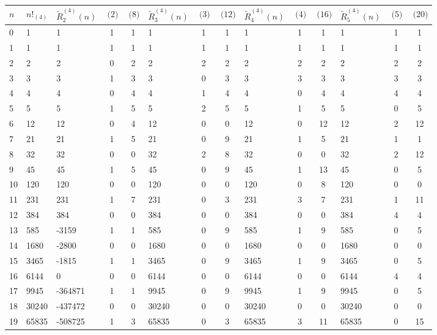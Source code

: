 \documentclass[12pt,reqno]{article}
\numberwithin{sfootnote}{section}
\newcommand{\tabletopstrut}[0]{\rule{0pt}{3ex}}
\numberwithin{equation}{section}
\theoremstyle{plain}
\theoremstyle{definition}
\theoremstyle{remark}
\newcommand{\MultiFactorial}[2]{\ensuremath{#1!_{\left(#2\right)}}}
\begin{document}
\begin{sidewaystable} 
\centering 
\smaller 

\begin{tabular}{|l|l|lcc|lcc|lcc|lcc|} \hline 
\hline\tabletopstrut 
$n$ & $\MultiFactorial{n}{4}$ & 
$\widetilde{R}_2^{(4)}(n)$ & $\pod{2}$ & $\pod{8}$ &
$\widetilde{R}_3^{(4)}(n)$ & $\pod{3}$ & $\pod{12}$ &
$\widetilde{R}_4^{(4)}(n)$ & $\pod{4}$ & $\pod{16}$ &
$\widetilde{R}_5^{(4)}(n)$ & $\pod{5}$ & $\pod{20}$ \\ \hline 
 0 & 1 & 1 & 1 & 1 & 1 & 1 & 1 & 1 & 1 & 1 & 1 & 1 & 1 \\
 1 & 1 & 1 & 1 & 1 & 1 & 1 & 1 & 1 & 1 & 1 & 1 & 1 & 1 \\
 2 & 2 & 2 & 0 & 2 & 2 & 2 & 2 & 2 & 2 & 2 & 2 & 2 & 2 \\
 3 & 3 & 3 & 1 & 3 & 3 & 0 & 3 & 3 & 3 & 3 & 3 & 3 & 3 \\
 4 & 4 & 4 & 0 & 4 & 4 & 1 & 4 & 4 & 0 & 4 & 4 & 4 & 4 \\
 5 & 5 & 5 & 1 & 5 & 5 & 2 & 5 & 5 & 1 & 5 & 5 & 0 & 5 \\
 6 & 12 & 12 & 0 & 4 & 12 & 0 & 0 & 12 & 0 & 12 & 12 & 2 & 12 \\
 7 & 21 & 21 & 1 & 5 & 21 & 0 & 9 & 21 & 1 & 5 & 21 & 1 & 1 \\
 8 & 32 & 32 & 0 & 0 & 32 & 2 & 8 & 32 & 0 & 0 & 32 & 2 & 12 \\
 9 & 45 & 45 & 1 & 5 & 45 & 0 & 9 & 45 & 1 & 13 & 45 & 0 & 5 \\
 10 & 120 & 120 & 0 & 0 & 120 & 0 & 0 & 120 & 0 & 8 & 120 & 0 & 0 \\
 11 & 231 & 231 & 1 & 7 & 231 & 0 & 3 & 231 & 3 & 7 & 231 & 1 & 11 \\
 12 & 384 & 384 & 0 & 0 & 384 & 0 & 0 & 384 & 0 & 0 & 384 & 4 & 4 \\
 13 & 585 & -3159 & 1 & 1 & 585 & 0 & 9 & 585 & 1 & 9 & 585 & 0 & 5 \\
 14 & 1680 & -2800 & 0 & 0 & 1680 & 0 & 0 & 1680 & 0 & 0 & 1680 & 0 & 0 \\
 15 & 3465 & -1815 & 1 & 1 & 3465 & 0 & 9 & 3465 & 1 & 9 & 3465 & 0 & 5 \\
 16 & 6144 & 0 & 0 & 0 & 6144 & 0 & 0 & 6144 & 0 & 0 & 6144 & 4 & 4 \\
 17 & 9945 & -364871 & 1 & 1 & 9945 & 0 & 9 & 9945 & 1 & 9 & 9945 & 0 & 5 \\
 18 & 30240 & -437472 & 0 & 0 & 30240 & 0 & 0 & 30240 & 0 & 0 & 30240 & 0 & 0 \\
 19 & 65835 & -508725 & 1 & 3 & 65835 & 0 & 3 & 65835 & 3 & 11 & 65835 & 0 & 15 \\

\end{tabular}
\end{sidewaystable}
\end{document}
